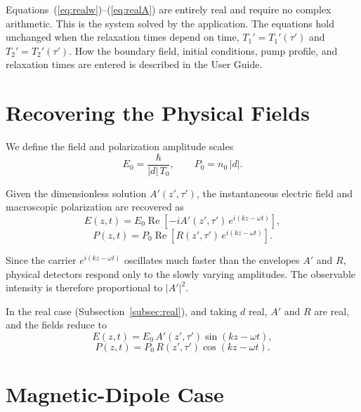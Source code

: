 \documentclass[12pt,a4paper]{article}
\newcommand{\T}{T_0}
\begin{document}
\begin{notebox}
  Equations~(\ref{eq:realw})--(\ref{eq:realA}) are entirely real and
  require no complex arithmetic. This is the system solved by the
  application. The equations hold unchanged when the relaxation times
  depend on time, $T_1' = T_1'(\tau')$ and $T_2' = T_2'(\tau')$.
  How the boundary field, initial conditions, pump profile, and
  relaxation times are entered is described in the User Guide.
\end{notebox}
\section{Recovering the Physical Fields}

We define the field and polarization amplitude scales
\begin{equation}
  E_0 = \frac{\hbar}{|d|\,\T}, \qquad P_0 = n_0\,|d|.
\end{equation}

Given the dimensionless solution $A'(z',\tau')$, the instantaneous
electric field and macroscopic polarization are recovered as
\begin{equation}
  E(z,t) = E_0\operatorname{Re}\!\left[-iA'(z',\tau')\,e^{i(kz-\omega t)}\right],
\end{equation}
\begin{equation}
  P(z,t) = P_0\operatorname{Re}\!\left[R(z',\tau')\,e^{i(kz-\omega t)}\right].
\end{equation}

Since the carrier $e^{i(kz-\omega t)}$ oscillates much faster than the
envelopes $A'$ and $R$, physical detectors respond only to the slowly
varying amplitudes. The observable intensity is therefore proportional
to $|A'|^2$.

In the real case (Subsection~\ref{subsec:real}), and taking $d$ real, $A'$ and $R$ are real, and the fields reduce to
\begin{equation}
  E(z,t) = E_0\,A'(z',\tau')\sin(kz-\omega t),
\end{equation}
\begin{equation}
  P(z,t) = P_0\,R(z',\tau')\cos(kz-\omega t).
\end{equation}

\section{Magnetic-Dipole Case}
\label{sec:magnetic}
\end{document}
